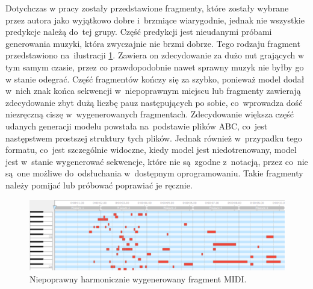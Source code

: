 \documentclass[data-science]{agh-wi} %
\begin{document}
Dotychczas w pracy zostały przedstawione fragmenty, które zostały wybrane przez autora jako wyjątkowo dobre i~brzmiące wiarygodnie, jednak nie wszystkie predykcje należą do~tej grupy. Część predykcji jest nieudanymi próbami generowania muzyki, która zwyczajnie nie brzmi dobrze. Tego rodzaju fragment przedstawiono na~ilustracji \ref*{fig:bad_midi}. Zawiera on zdecydowanie za dużo nut grających w tym samym czasie, przez co prawdopodobnie nawet sprawny muzyk nie byłby go w stanie odegrać. Część fragmentów kończy się za szybko, ponieważ model dodał w~nich znak końca sekwencji w~niepoprawnym miejscu lub fragmenty zawierają zdecydowanie zbyt dużą liczbę pauz następujących po sobie, co~wprowadza dość niezręczną ciszę w~wygenerowanych fragmentach. Zdecydowanie większa część udanych generacji modelu powstała na~podstawie plików ABC, co~jest następstwem prostszej struktury tych plików. Jednak również w~przypadku tego formatu, co~jest szczególnie widoczne, kiedy model jest niedotrenowany, model jest w~stanie wygenerować sekwencje, które nie są~zgodne z~notacją, przez co~nie są~one możliwe do~odsłuchania w~dostępnym oprogramowaniu. Takie fragmenty należy pomijać lub próbować poprawiać je ręcznie.

\begin{figure}[ht!]
    \centering
    \includegraphics[width=0.9\linewidth]{./img/bad_midi.png}
    \caption{Niepoprawny harmonicznie wygenerowany fragment MIDI.}
    \label{fig:bad_midi}
\end{figure}
\end{document}
